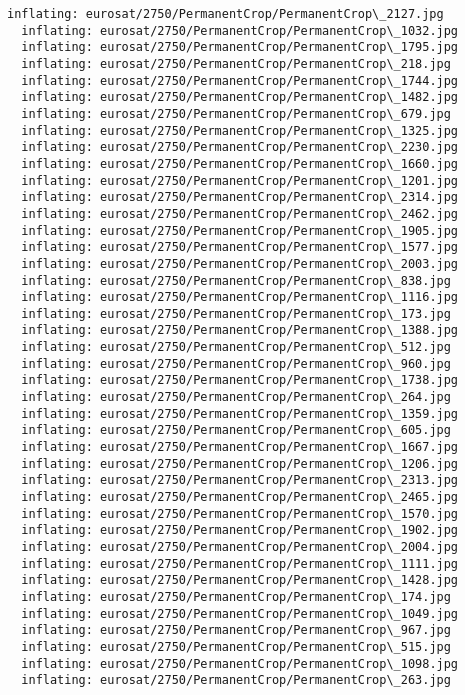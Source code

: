 \documentclass[11pt]{article}
\begin{document}
\begin{Verbatim}[commandchars=\\\{\}]
  inflating: eurosat/2750/PermanentCrop/PermanentCrop\_2127.jpg
  inflating: eurosat/2750/PermanentCrop/PermanentCrop\_1032.jpg
  inflating: eurosat/2750/PermanentCrop/PermanentCrop\_1795.jpg
  inflating: eurosat/2750/PermanentCrop/PermanentCrop\_218.jpg
  inflating: eurosat/2750/PermanentCrop/PermanentCrop\_1744.jpg
  inflating: eurosat/2750/PermanentCrop/PermanentCrop\_1482.jpg
  inflating: eurosat/2750/PermanentCrop/PermanentCrop\_679.jpg
  inflating: eurosat/2750/PermanentCrop/PermanentCrop\_1325.jpg
  inflating: eurosat/2750/PermanentCrop/PermanentCrop\_2230.jpg
  inflating: eurosat/2750/PermanentCrop/PermanentCrop\_1660.jpg
  inflating: eurosat/2750/PermanentCrop/PermanentCrop\_1201.jpg
  inflating: eurosat/2750/PermanentCrop/PermanentCrop\_2314.jpg
  inflating: eurosat/2750/PermanentCrop/PermanentCrop\_2462.jpg
  inflating: eurosat/2750/PermanentCrop/PermanentCrop\_1905.jpg
  inflating: eurosat/2750/PermanentCrop/PermanentCrop\_1577.jpg
  inflating: eurosat/2750/PermanentCrop/PermanentCrop\_2003.jpg
  inflating: eurosat/2750/PermanentCrop/PermanentCrop\_838.jpg
  inflating: eurosat/2750/PermanentCrop/PermanentCrop\_1116.jpg
  inflating: eurosat/2750/PermanentCrop/PermanentCrop\_173.jpg
  inflating: eurosat/2750/PermanentCrop/PermanentCrop\_1388.jpg
  inflating: eurosat/2750/PermanentCrop/PermanentCrop\_512.jpg
  inflating: eurosat/2750/PermanentCrop/PermanentCrop\_960.jpg
  inflating: eurosat/2750/PermanentCrop/PermanentCrop\_1738.jpg
  inflating: eurosat/2750/PermanentCrop/PermanentCrop\_264.jpg
  inflating: eurosat/2750/PermanentCrop/PermanentCrop\_1359.jpg
  inflating: eurosat/2750/PermanentCrop/PermanentCrop\_605.jpg
  inflating: eurosat/2750/PermanentCrop/PermanentCrop\_1667.jpg
  inflating: eurosat/2750/PermanentCrop/PermanentCrop\_1206.jpg
  inflating: eurosat/2750/PermanentCrop/PermanentCrop\_2313.jpg
  inflating: eurosat/2750/PermanentCrop/PermanentCrop\_2465.jpg
  inflating: eurosat/2750/PermanentCrop/PermanentCrop\_1570.jpg
  inflating: eurosat/2750/PermanentCrop/PermanentCrop\_1902.jpg
  inflating: eurosat/2750/PermanentCrop/PermanentCrop\_2004.jpg
  inflating: eurosat/2750/PermanentCrop/PermanentCrop\_1111.jpg
  inflating: eurosat/2750/PermanentCrop/PermanentCrop\_1428.jpg
  inflating: eurosat/2750/PermanentCrop/PermanentCrop\_174.jpg
  inflating: eurosat/2750/PermanentCrop/PermanentCrop\_1049.jpg
  inflating: eurosat/2750/PermanentCrop/PermanentCrop\_967.jpg
  inflating: eurosat/2750/PermanentCrop/PermanentCrop\_515.jpg
  inflating: eurosat/2750/PermanentCrop/PermanentCrop\_1098.jpg
  inflating: eurosat/2750/PermanentCrop/PermanentCrop\_263.jpg

\end{Verbatim}
\end{document}
